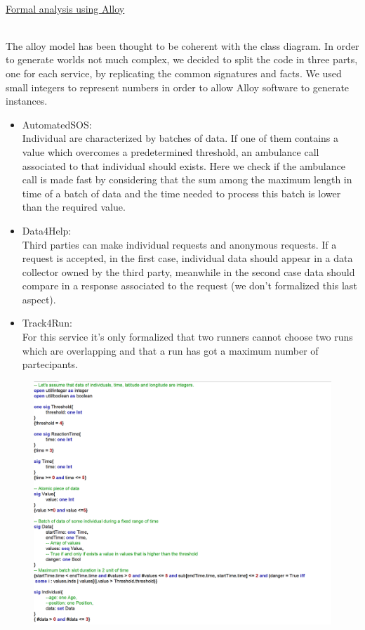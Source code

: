 \documentclass{article}
\begin{document}
\begin{legal}
\begin{legal}
\begin{legal}
			\\
		\end{legal}
		\end{legal}
	\newpage
	\item \underline{Formal analysis using Alloy}\\\\
	{\normalfont
	The alloy model has been thought to be coherent with the class diagram. In order to generate worlds not much complex, we decided to split the code in three parts, one for each service, by replicating the common signatures and facts. We used small integers to represent numbers in order to allow Alloy software to generate instances. 
		\begin{itemize}
		\item AutomatedSOS:\\Individual are characterized by batches of data. If one of them contains a value which overcomes a predetermined threshold, an ambulance call associated to that individual should exists. Here we check if the ambulance call is made fast by considering that the sum among the maximum length in time of a batch of data and the time needed to process this batch is lower than the required value.
		\item Data4Help:\\Third parties can make individual requests and anonymous requests. If a request is accepted, in the first case, individual data should appear in a data collector owned by the third party, meanwhile in the second case data should compare in a response associated to the request (we don't formalized this last aspect).
		\item Track4Run:\\For this service it's only formalized that two runners cannot choose two runs which are overlapping and that a run has got a maximum number of partecipants.
		\end{itemize}
		} 
		\begin{figure}[H]
			\newpage
			\includegraphics[width=\linewidth]{./images/alloy/code/automated_1.PNG}

\end{figure}
\end{legal}
\end{document}
